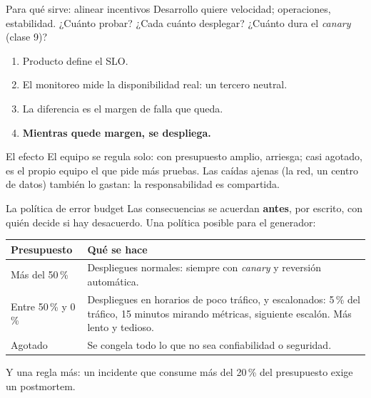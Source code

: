 \documentclass[institutional,screen,none]{ua-engineering-v6-beamer}
\begin{document}
\begin{frame}{Para qué sirve: alinear incentivos}
Desarrollo quiere velocidad; operaciones, estabilidad. ¿Cuánto probar? ¿Cada cuánto desplegar? ¿Cuánto dura el \emph{canary} (clase 9)?

\pause

\begin{enumerate}
\item Producto define el SLO.
\item El monitoreo mide la disponibilidad real: un tercero neutral.
\item La diferencia es el margen de falla que queda.
\item \textbf{Mientras quede margen, se despliega.}
\end{enumerate}

\pause

\begin{block}{El efecto}
El equipo se regula solo: con presupuesto amplio, arriesga; casi agotado, es el propio equipo el que pide más pruebas. Las caídas ajenas (la red, un centro de datos) también lo gastan: la responsabilidad es compartida.
\end{block}
\end{frame}

\begin{frame}{La política de error budget}
Las consecuencias se acuerdan \textbf{antes}, por escrito, con quién decide si hay desacuerdo. Una política posible para el generador:

\begin{center}
\small
\begin{tabular}{p{}p{}}
\toprule
\textbf{Presupuesto} & \textbf{Qué se hace} \\
\midrule
Más del 50\,\% & Despliegues normales: siempre con \emph{canary} y reversión automática. \\
Entre 50\,\% y 0\,\% & Despliegues en horarios de poco tráfico, y escalonados: 5\,\% del tráfico, 15 minutos mirando métricas, siguiente escalón. Más lento y tedioso. \\
Agotado & Se congela todo lo que no sea confiabilidad o seguridad. \\
\bottomrule
\end{tabular}
\end{center}

{\small Y una regla más: un incidente que consume más del 20\,\% del presupuesto exige un postmortem.}
\end{frame}
\end{document}
